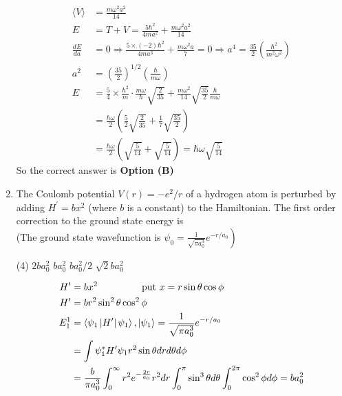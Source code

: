 \begin{enumerate}
\begin{answer}
\begin{align*}
\langle V\rangle&=\frac{m \omega^{2} a^{2}}{14}\\
E&=T+V=\frac{5 \hbar^{2}}{4 m a^{2}}+\frac{m \omega^{2} a^{2}}{14}\\
\frac{d E}{d a}&=0 \Rightarrow \frac{5 \times(-2) \hbar^{2}}{4 m a^{3}}+\frac{m \omega^{2} a}{7}=0 \Rightarrow a^{4}=\frac{35}{2}\left(\frac{\hbar^{2}}{m^{2} \omega^{2}}\right)\\
a^{2}&=\left(\frac{35}{2}\right)^{1 / 2}\left(\frac{\hbar}{m \omega}\right)\\
E&=\frac{5}{4} \times \frac{\hbar^{2}}{m} \cdot \frac{m \omega}{\hbar} \sqrt{\frac{2}{35}}+\frac{m \omega^{2}}{14} \sqrt{\frac{35}{2}} \frac{\hbar}{m \omega}\\
&=\frac{\hbar \omega}{2}\left(\frac{5}{2} \sqrt{\frac{2}{35}}+\frac{1}{7} \sqrt{\frac{35}{2}}\right)\\&=\frac{\hbar \omega}{2}\left(\sqrt{\frac{5}{14}}+\sqrt{\frac{5}{14}}\right)=\hbar \omega \sqrt{\frac{5}{14}}
\end{align*}
So the correct answer is \textbf{Option (B)}
\end{answer}	
\item The Coulomb potential $V(r)=-e^{2} / r$ of a hydrogen atom is perturbed by adding $H^{\prime}=b x^{2}$ (where $b$ is a constant) to the Hamiltonian. The first order correction to the ground state energy is\\
(The ground state wavefunction is $\left.\psi_{0}=\frac{1}{\sqrt{\pi a_{0}^{3}}} e^{-r / a_{0}}\right)$
{}
\begin{tasks}(4)
\task[\textbf{A.}] $2 b a_{0}^{2}$
\task[\textbf{B.}] $b a_{0}^{2}$
\task[\textbf{C.}] $b a_{0}^{2} / 2$
\task[\textbf{D.}] $\sqrt{2} b a_{0}^{2}$
\end{tasks}
\begin{answer}
\begin{align*}
H^{\prime}&=b x^{2} \hspace{1.5cm}\text{ put }x=r \sin \theta \cos \phi\\
H^{\prime}&=b r^{2} \sin ^{2} \theta \cos ^{2} \phi\\
E_{1}^{1}&=\left\langle\psi_{1}\left|H^{\prime}\right| \psi_{1}\right\rangle,\left|\psi_{1}\right\rangle=\frac{1}{\sqrt{\pi a_{0}^{3}}} e^{-r / a_{0}}\\
&=\int \psi_{1}^{*} H^{\prime} \psi_{1} r^{2} \sin \theta d r d \theta d \phi\\
&=\frac{b}{\pi a_{0}^{3}} \int_{0}^{\infty} r^{2} e^{-\frac{2 r}{a_{0}}} r^{2} d r \int_{0}^{\pi} \sin ^{3} \theta d \theta \int_{0}^{2 \pi} \cos ^{2} \phi d \phi=b a_{0}^{2}

\end{align*}
\end{answer}
\end{enumerate}
